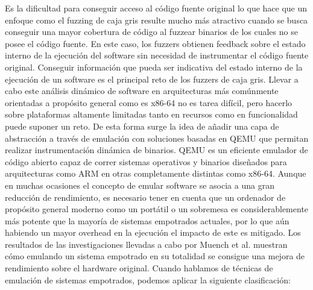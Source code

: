 Es la dificultad para conseguir acceso al código fuente original lo que hace que un enfoque como el fuzzing de caja gris resulte mucho más atractivo 
cuando se busca conseguir una mayor cobertura de código al fuzzear binarios de los cuales no se posee el código fuente. En este caso, los fuzzers obtienen 
feedback sobre el estado interno de la ejecución del software sin necesidad de instrumentar el código fuente original. Conseguir información que pueda ser
indicativa del estado interno de la ejecución de un software es el principal reto de los fuzzers de caja gris. 
Llevar a cabo este análisis dinámico de software en arquitecturas más comúnmente orientadas a 
propósito general como es x86-64 no es tarea difícil, pero hacerlo sobre plataformas altamente limitadas tanto en recursos como en funcionalidad
puede suponer un reto. De esta forma surge la idea de añadir una capa de abstracción a través de emulación con soluciones basadas en QEMU\cite{qemu}
que permitan realizar instrumentación dinámica de binarios. QEMU es un eficiente emulador de código abierto capaz de correr sistemas operativos y binarios
diseñados para arquitecturas como ARM en otras completamente distintas como x86-64. Aunque en muchas ocasiones el concepto de emular software se asocia a
una gran reducción de rendimiento, es necesario tener en cuenta que un ordenador de propósito general moderno como un portátil o un sobremesa es 
considerablemente más potente que la mayoría de sistemas empotrados actuales, por lo que aún habiendo un mayor overhead en la ejecución el impacto de este es mitigado.
Los resultados de las investigaciones llevadas a cabo por Muench et al.\cite{Muench2018} muestran cómo emulando un sistema empotrado en su totalidad 
se consigue una mejora de rendimiento sobre el hardware original.
Cuando hablamos de técnicas de emulación de sistemas empotrados, podemos aplicar la siguiente clasificación:
